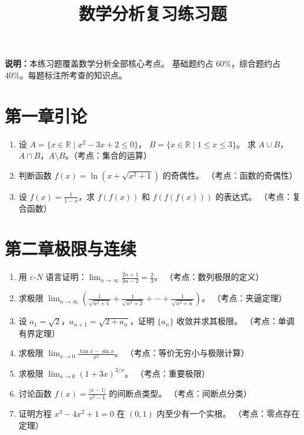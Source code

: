 \documentclass[12pt,a4paper]{ctexart}
\title{数学分析复习练习题}
\author{}
\date{}
\begin{document}
\maketitle

\begin{center}
\textbf{说明：}本练习题覆盖数学分析全部核心考点。
基础题约占 60\%，综合题约占 40\%。每题标注所考查的知识点。
\end{center}

\bigskip

\section*{第一章\quad 引论}

\begin{enumerate}[leftmargin=*,label=\arabic*.]
  \item 设 $A = \{x \in \mathbb{R} \mid x^2 - 3x + 2 \le 0\}$，
    $B = \{x \in \mathbb{R} \mid 1 \le x \le 3\}$。
    求 $A \cup B$，$A \cap B$，$A \setminus B$。（考点：集合的运算）

  \item 判断函数 $f(x) = \ln(x + \sqrt{x^2+1})$ 的奇偶性。
    （考点：函数的奇偶性）

  \item 设 $f(x) = \frac{1}{1-x}$，求 $f(f(x))$ 和 $f(f(f(x)))$ 的表达式。
    （考点：复合函数）
\end{enumerate}

\section*{第二章\quad 极限与连续}

\begin{enumerate}[leftmargin=*,label=\arabic*.,start=4]
  \item 用 $\varepsilon$-$N$ 语言证明：$\displaystyle\lim_{n\to\infty}\frac{2n+1}{3n-2} = \frac{2}{3}$。
    （考点：数列极限的定义）

  \item 求极限 $\displaystyle\lim_{n\to\infty}\left(\frac{1}{\sqrt{n^2+1}} + \frac{1}{\sqrt{n^2+2}} + \cdots + \frac{1}{\sqrt{n^2+n}}\right)$。
    （考点：夹逼定理）

  \item 设 $a_1 = \sqrt{2}$，$a_{n+1} = \sqrt{2+a_n}$，证明 $\{a_n\}$ 收敛并求其极限。
    （考点：单调有界定理）

  \item 求极限 $\displaystyle\lim_{x\to 0}\frac{\tan x - \sin x}{x^3}$。
    （考点：等价无穷小与极限计算）

  \item 求极限 $\displaystyle\lim_{x\to 0}(1+3x)^{2/x}$。
    （考点：重要极限）

  \item 讨论函数 $f(x) = \frac{|x-1|}{x^2-1}$ 的间断点类型。
    （考点：间断点分类）

  \item 证明方程 $x^3 - 4x^2 + 1 = 0$ 在 $(0,1)$ 内至少有一个实根。
    （考点：零点存在定理）
\end{enumerate}
\end{document}
